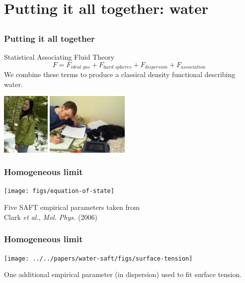 \section{Putting it all together: water}

\subsection{}

\begin{frame}
  \frametitle{Putting it all together}
  \begin{block}{Statistical Associating Fluid Theory}
    \[
    F = F_{\textit{ideal gas}} + F_{\textit{hard spheres}} + F_{\textit{dispersion}} + F_{\textit{association}}
    \]
    We combine these terms to produce a classical density functional
    describing water.
  \end{block}
  \begin{center}
    \includegraphics[height=3cm]{figs/HughesJessica}
    \includegraphics[height=3cm]{figs/KrebsEric}
  \end{center}
\end{frame}

\begin{frame}
  \frametitle{Homogeneous limit}
  \begin{center}
    \vspace{-1em}
    \texttt{[image: figs/equation-of-state]}
   \end{center}
  Five SAFT empirical parameters taken from\\\hfill Clark \emph{et al.}, \emph{Mol. Phys.}
  (2006)
\end{frame}

\begin{frame}
  \frametitle{Homogeneous limit}
  \begin{center}
    \vspace{-1em}
    \texttt{[image: ../../papers/water-saft/figs/surface-tension]}
  \end{center}
  \vspace{-1.5em}
  One additional empirical parameter (in dispersion) used to fit
  surface tension.
\end{frame}

